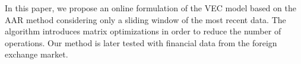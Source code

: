 In this paper, we propose an online formulation of the VEC model based on the
AAR method considering only a sliding window of the most recent data. The
algorithm introduces matrix optimizations in order to reduce the number of
operations. Our method is later tested with financial data from the foreign
exchange market.

